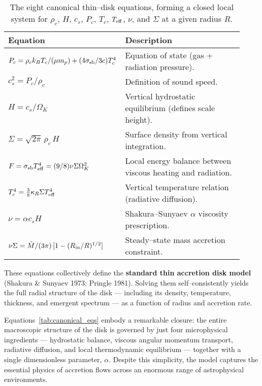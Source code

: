 \begin{table}[ht!]
\centering
\renewcommand{\arraystretch}{1.4}
\begin{tabular}{p{0.40\linewidth} p{0.52\linewidth}}
\toprule
\textbf{Equation} & \textbf{Description} \\
\midrule
$P_c = \rho_c k_B T_c / (\mu m_p) + (4\sigma_{\rm sb}/3c)T_c^4$ 
& Equation of state (gas + radiation pressure). \\[4pt]
$c_s^2 = P_c / \rho_c$ 
& Definition of sound speed. \\[4pt]
$H = c_s / \Omega_K$ 
& Vertical hydrostatic equilibrium (defines scale height). \\[4pt]
$\Sigma = \sqrt{2\pi}\,\rho_c\,H$ 
& Surface density from vertical integration. \\[4pt]
$F = \sigma_{\rm sb} T_{\rm eff}^4 = (9/8)\nu\Sigma\Omega_K^2$ 
& Local energy balance between viscous heating and radiation. \\[4pt]
$T_c^4 = \frac{3}{8}\kappa_R \Sigma T_{\rm eff}^4$ 
& Vertical temperature relation (radiative diffusion). \\[4pt]
$\nu = \alpha c_s H$ 
& Shakura–Sunyaev $\alpha$ viscosity prescription. \\[4pt]
$\nu\Sigma = \dot{M}/(3\pi)\,[1 - (R_{\rm in}/R)^{1/2}]$ 
& Steady–state mass accretion constraint. \\[4pt]
\bottomrule
\end{tabular}
\caption{The eight canonical thin–disk equations, forming a closed local system for $\rho_c$, $H$, $c_s$, $P_c$, $T_c$, $T_{\rm eff}$, $\nu$, and $\Sigma$ at a given radius $R$.}
\label{tab:canonical_eqs}
\end{table}

\noindent
These equations collectively define the \textbf{standard thin accretion disk model} (Shakura \& Sunyaev 1973; Pringle 1981).  
Solving them self–consistently yields the full radial structure of the disk — including its density, temperature, thickness, and emergent spectrum — as a function of radius and accretion rate.

\begin{remark}
Equations~\eqref{tab:canonical_eqs} embody a remarkable closure:
the entire macroscopic structure of the disk is governed by just four microphysical ingredients — 
hydrostatic balance, viscous angular momentum transport, radiative diffusion, and local thermodynamic equilibrium — together with a single dimensionless parameter, $\alpha$.  
Despite this simplicity, the model captures the essential physics of accretion flows across an enormous range of astrophysical environments.
\end{remark}

